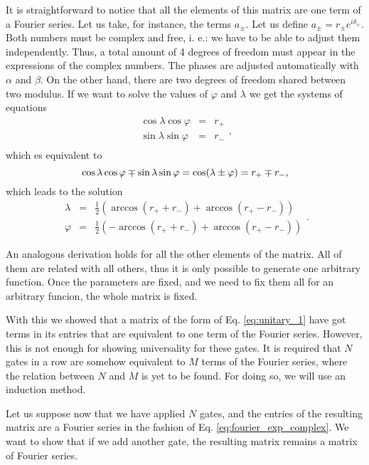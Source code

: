 \documentclass[aps,amssymb,amsmath,amsfonts,pra,superscriptaddress,onecolumn]{revtex4}
\begin{document}
It is straightforward to notice that all the elements of this matrix are one term of a Fourier series. Let us take, for instance, the terms $a_\pm$. Let us define $a_\pm = r_\pm e^{i \delta_\pm}$. Both numbers must be complex and free, i. e.: we have to be able to adjust them independently. Thus, a total amount of 4 degrees of freedom must appear in the expressions of the complex numbers. The phases are adjusted automatically with $\alpha$ and $\beta$. On the other hand, there are two degrees of freedom shared between two modulus. If we want to solve the values of $\varphi$ and $\lambda$ we get the systems of equations
\begin{equation}
\begin{matrix}
\cos\lambda \cos\varphi & = & r_+ \\
\sin\lambda \sin\varphi & = & r_- \\
\end{matrix}, 
\end{equation}
which es equivalent to 
\begin{equation}
\cos\lambda \cos\varphi \mp \sin\lambda \sin\varphi = \cos(\lambda \pm \varphi) = r_+ \mp r_- \\, 
\end{equation}
which leads to the solution
\begin{equation}
\begin{matrix}
\lambda & = & \frac{1}{2} \left(\arccos(r_+ + r_-) + \arccos(r_+ - r_-) \right) \\
\varphi & = & \frac{1}{2} \left(- \arccos(r_+ + r_-) + \arccos(r_+ - r_-) \right) 
\end{matrix}.
\end{equation}

An analogous derivation holds for all the other elements of the matrix. All of them are related with all others, thus it is only possible to generate one arbitrary function. Once the parameters are fixed, and we need to fix them all for an arbitrary funcion, the whole matrix is fixed.

With this we showed that a matrix of the form of Eq. \eqref{eq:unitary_1} have got terms in its entries that are equivalent to one term of the Fourier series. However, this is not enough for showing universality for these gates. It is required that $N$ gates in a row are somehow equivalent to $M$ terms of the Fourier series, where the relation between $N$ and $M$ is yet to be found. For doing so, we will use an induction method. 

Let us suppose now that we have applied $N$ gates, and the entries of the resulting matrix are a Fourier series in the fashion of Eq. \eqref{eq:fourier_exp_complex}. We want to show that if we add another gate, the resulting matrix remains a matrix of Fourier series. 
\end{document}
